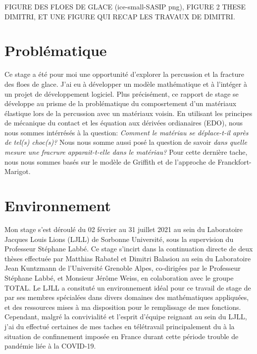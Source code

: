 FIGURE DES FLOES DE GLACE (ice-small-SASIP png), FIGURE 2 THESE DIMITRI, ET UNE FIGURE QUI RECAP LES TRAVAUX DE DIMITRI.








\section{Problématique}

Ce stage a été pour moi une opportunité d'explorer la percussion et la fracture des floes de glace. J'ai eu à développer un modèle mathématique et à l'intéger à un projet de développement logiciel. Plus précisément, ce rapport de stage se développe au prisme de la problématique du composrtement d'un matériaux élastique lors de la percussion avec un matériaux voisin. En utilisant les principes de mécanique du contact et les équation aux dérivées ordianaires (EDO), nous nous sommes intérrésés à la question: \emph{Comment le matériau se déplace-t-il après de tel(s) choc(s)?} Nous nous somme aussi posé la question de savoir \emph{dans quelle mesure une fracrure apparait-t-elle dans le matériau?} Pour cette dernière tache, nous nous sommes basés sur le modèle de Griffith et de l'approche de Franckfort-Marigot.











\section{Environnement}

Mon stage s'est déroulé du 02 février au 31 juillet 2021 au sein du Laboratoire Jacques Louis Lions (LJLL) de Sorbonne Université, sous la supervision du Professeur Stéphane Labbé. Ce stage s'incirt dans la continuation directe de deux thèses effectuée par Matthias Rabatel \Parencite{rabatel2015thesis} et Dimitri Balasiou \parencite{balasoiu2020halthesis} au sein du Laboratoire Jean Kuntzmann de l'Université Grenoble Alpes, co-dirigées par le Professeur Stéphane Labbé, et Monsieur Jérôme Weiss, en colaboration avec le groupe TOTAL. Le LJLL a consituté un environnement idéal pour ce travail de stage de par ses membres spécialées dans divers domaines des mathématiques appliquées, et des ressources mises à ma disposition pour le remplissage de mes fonctions. Cependant, malgré la convivialité et l'esprit d'équipe reignant au sein du LJLL, j'ai  du effectué certaines de mes taches en télétravail principalement du à la situation de confinnement imposée en France durant cette période trouble de pandémie liée à la COVID-19.


